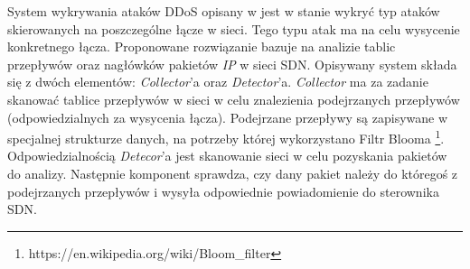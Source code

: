 System wykrywania ataków DDoS opisany w \cite{bloomarticle} jest w stanie wykryć
typ ataków skierowanych na poszczególne łącze w sieci. Tego typu atak ma na celu
wysycenie konkretnego łącza. Proponowane rozwiązanie bazuje na analizie tablic
przepływów oraz nagłówków pakietów \textit{IP} w sieci SDN. Opisywany system
składa się z dwóch elementów: \textit{Collector}'a oraz \textit{Detector}'a.
\textit{Collector} ma za zadanie skanować tablice przepływów w sieci w celu
znalezienia podejrzanych przepływów (odpowiedzialnych za wysycenia łącza).
Podejrzane przepływy są zapisywane w specjalnej strukturze danych, na potrzeby
której wykorzystano Filtr Blooma
\footnote{https://en.wikipedia.org/wiki/Bloom\_filter}. Odpowiedzialnością
\textit{Detecor}'a jest skanowanie sieci w celu pozyskania pakietów do analizy.
Następnie komponent sprawdza, czy dany pakiet należy do któregoś z podejrzanych
przepływów i wysyła odpowiednie powiadomienie do sterownika SDN.